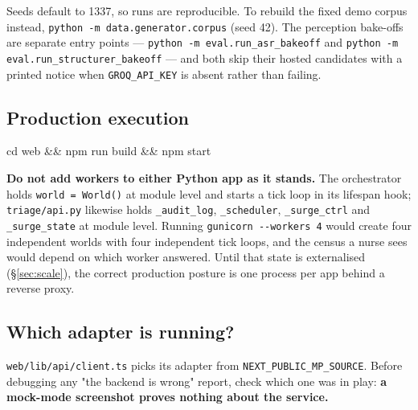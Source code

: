 \documentclass[10pt,a4paper,twocolumn]{article}
\newcommand{\pth}[1]{\textcolor{SecPurple}{\texttt{#1}}}
\newcommand{\cm}[1]{\texttt{#1}}
\begin{document}
\noindent Seeds default to 1337, so runs are reproducible. To rebuild the fixed demo corpus
instead, \cm{python -m data.generator.corpus} (seed 42). The perception bake-offs are separate
entry points --- \cm{python -m eval.run\_asr\_bakeoff} and
\cm{python -m eval.run\_structurer\_bakeoff} --- and both skip their hosted candidates with a
printed notice when \cm{GROQ\_API\_KEY} is absent rather than failing.

\subsection{Production execution}
\begin{tcolorbox}[mpcode]
cd web \&\& npm run build \&\& npm start
\end{tcolorbox}

\begin{tcolorbox}[mpwarn]
\textbf{Do not add workers to either Python app as it stands.} The orchestrator holds
\cm{world = World()} at module level and starts a tick loop in its lifespan hook; \pth{triage/api.py}
likewise holds \cm{\_audit\_log}, \cm{\_scheduler}, \cm{\_surge\_ctrl} and \cm{\_surge\_state} at
module level. Running \cm{gunicorn -{}-workers 4} would create four independent worlds with four
independent tick loops, and the census a nurse sees would depend on which worker answered. Until
that state is externalised (\S\ref{sec:scale}), the correct production posture is one process per
app behind a reverse proxy.
\end{tcolorbox}

\subsection{Which adapter is running?}
\pth{web/lib/api/client.ts} picks its adapter from \cm{NEXT\_PUBLIC\_MP\_SOURCE}. Before debugging
any "the backend is wrong" report, check which one was in play: \textbf{a mock-mode screenshot
proves nothing about the service.}
\end{document}
